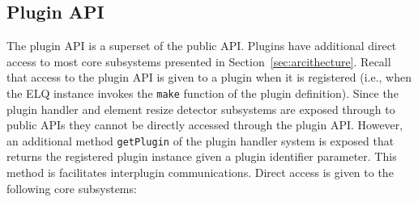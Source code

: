 \documentclass[a4paper,11pt]{kth-mag}
\newcommand{\code}[1]{\texttt{#1}}
\begin{document}
      \subsection{Plugin API}\label{sec:plugin-api}
        The plugin \gls{API} is a superset of the public \gls{API}.
        Plugins have additional direct access to most core subsystems presented in Section~\ref{sec:arcithecture}.
        Recall that access to the plugin \gls{API} is given to a plugin when it is registered (i.e., when the \gls{ELQ} instance invokes the \code{make} function of the plugin definition).
        Since the plugin handler and element resize detector subsystems are exposed through to public \glspl{API} they cannot be directly accessed through the plugin \gls{API}.
        However, an additional method \code{getPlugin} of the plugin handler system is exposed that returns the registered plugin instance given a plugin identifier parameter.
        This method is facilitates interplugin communications.
        Direct access is given to the following core subsystems:
\end{document}
